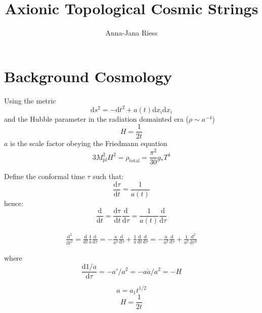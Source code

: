 \documentclass[a4paper]{article}
\begin{document}
	
\title{Axionic Topological Cosmic Strings}
\author{Anna-Jana Riess}

\maketitle

\section{Background Cosmology}
Using the metric
\begin{equation}
    \mathrm{d}s^2 = -\mathrm{d}t^2 + a(t) \mathrm{d} x_i \mathrm{d} x_i
\end{equation}
and the Hubble parameter in the radiation domainted era ($\rho \sim a^{-4}$)
\begin{equation}
    H = \frac{1}{2t}
\end{equation}
$a$ is the scale factor obeying the Friedmann equation
\begin{equation}
	\label{eq:friedmann_radiation}
    3 M_\mathrm{pl}^2 H^2 = \rho_\mathrm{total} = \frac{\pi^2}{30} g_* T^4
\end{equation}

Define the conformal time $\tau$ such that:
\begin{equation}
    \frac{\mathrm{d} \tau}{\mathrm{d} t} = \frac{1}{a(t)}
\end{equation}
hence:
\begin{equation}
    \frac{\mathrm{d}}{\mathrm{d} t} = \frac{\mathrm{d \tau}}{\mathrm{d} t} \frac{\mathrm{d}}{\mathrm{d} \tau} = \frac{1}{a(t)} \frac{\mathrm{d}}{\mathrm{d} \tau}
\end{equation}

\begin{align}
    \frac{\mathrm{d}^2}{\mathrm{d} t^2} = \frac{\mathrm{d}}{\mathrm{d} t} \frac{1}{a} \frac{\mathrm{d}}{\mathrm{d} \tau}
    = - \frac{\dot{a}}{a^2} \frac{\mathrm{d}}{\mathrm{d} \tau} + \frac{1}{a} \frac{\mathrm{d}}{\mathrm{d} t} \frac{\mathrm{d}}{\mathrm{d} \tau}
     = - \frac{\dot{a}}{a^2} \frac{\mathrm{d}}{\mathrm{d} \tau} + \frac{1}{a^2} \frac{\mathrm{d}^2}{\mathrm{d} \tau^2}
\end{align}

where
\begin{equation}
    \frac{\mathrm{d} 1/a}{\mathrm{d} \tau} = - a' / a^2 = - a \dot{a} / a^2 = - H
\end{equation}

\begin{equation}
    a = a_1 t^{1/2}
\end{equation}
\begin{equation}
    H = \frac{1}{2t}
\end{equation}
\end{document}
